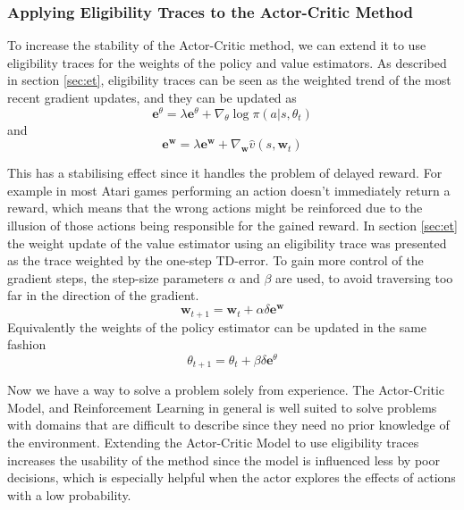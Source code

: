 \documentclass[11pt]{article}
\begin{document}

\subsubsection{Applying Eligibility Traces to the Actor-Critic Method}\label{sec:actor_critic_el}

To increase the stability of the Actor-Critic method, we can extend it to use eligibility traces
for the weights of the policy and value estimators.
As described in section \ref{sec:et}, eligibility traces can be seen as the weighted trend
of the most recent gradient updates, and they can be updated as
\begin{equation}
    \mathbf{e}^{\theta} = \lambda \mathbf{e}^{\theta} + \nabla_\theta \log\pi(a|s,\theta_t)
\end{equation}
and
\begin{equation}
    \mathbf{e}^{\mathbf{w}} = \lambda \mathbf{e}^{\mathbf{w}} + \nabla_\mathbf{w} \hat{v}(s, \mathbf{w}_t)
\end{equation}

This has a stabilising effect since it handles the problem of delayed reward.
For example in most Atari games performing an action doesn't immediately return a reward,
which means that the wrong actions might be reinforced due to the illusion
of those actions being responsible for the gained reward.
In section \ref{sec:et} the weight update of the value estimator
using an eligibility trace was presented as the trace weighted by
the one-step TD-error.
To gain more control of the gradient steps, the step-size parameters $\alpha$ and $\beta$ are used,
to avoid traversing too far in the direction of the gradient.
\begin{equation*}
    \mathbf{w}_{t+1}= \mathbf{w}_t + \alpha \delta \mathbf{e}^{\mathbf{w}}
\end{equation*}
Equivalently the weights of the policy estimator can be updated in the same fashion
\begin{equation}
    \theta_{t+1} = \theta_t + \beta \delta \mathbf{e}^\theta
\end{equation}

Now we have a way to solve a problem solely from experience.
The Actor-Critic Model, and Reinforcement Learning in general is well suited
to solve problems with domains that are difficult to describe since
they need no prior knowledge of the environment.
Extending the Actor-Critic Model to use eligibility traces 
increases the usability of the method since the model is 
influenced less by poor decisions, which is especially helpful
when the actor explores the effects of actions with a low probability.

%
%
\end{document}
